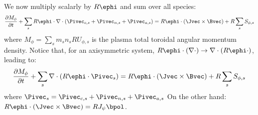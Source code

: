 We now multiply scalarly  by $R\ephi$ and sum over all species:
\begin{eqnarray}
 \frac{\partial M_\phi}{\partial{t}}+\sum_s R\ephi\cdot
\nabla\cdot\left(\Pivec_{c,s}
+\Pivec_{n,s}+\Pivec_{a,s}\right)=R\ephi\cdot\left(
\Jvec\times\Bvec\right) + R \sum_s S_{\phi,s}
\label{momtranspeq3drephi}
\end{eqnarray}
where $M_{\phi}=\sum_s m_s n_s R U_{\phi,s}$ is the plasma total toroidal angular momentum density.
Notice that, for an axisymmetric system, $R\ephi\cdot(\nabla\cdot) \rightarrow \nabla\cdot (R \ephi\cdot)$, leading to:
\begin{eqnarray}
 \frac{\partial M_\phi}{\partial{t}}+
\sum_s \nabla\cdot\left(R\ephi\cdot\Pivec_s\right)=R\ephi\cdot\left(
\Jvec\times\Bvec\right)  + R \sum_s S_{\phi,s}
\label{momtranspeq3drephi2}
\end{eqnarray}
where $\Pivec_s=\Pivec_{c,s}+\Pivec_{n,s}+\Pivec_{a,s}$
On the other hand: $R\ephi\cdot\left(
\Jvec\times\Bvec\right)=R J_\psi \bpol$.

